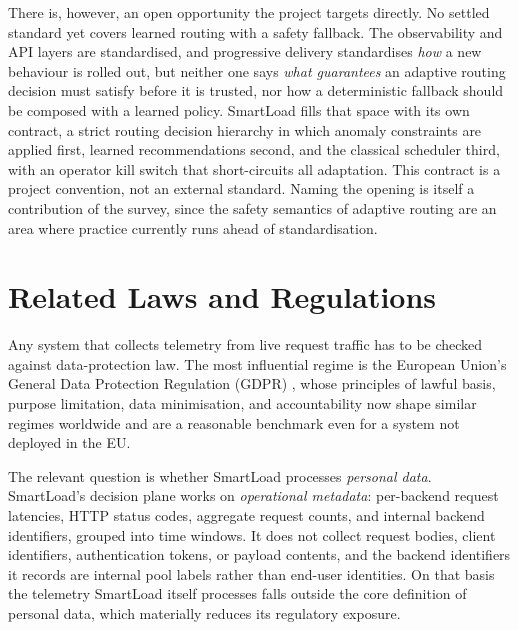 There is, however, an open opportunity the project targets directly. No settled
standard yet covers learned routing with a safety fallback. The observability
and API layers are standardised, and progressive delivery standardises
\emph{how} a new behaviour is rolled out, but neither one says \emph{what
guarantees} an adaptive routing decision must satisfy before it is trusted, nor
how a deterministic fallback should be composed with a learned policy. SmartLoad
fills that space with its own contract, a strict routing decision hierarchy in
which anomaly constraints are applied first, learned recommendations second, and
the classical scheduler third, with an operator kill switch that short-circuits
all adaptation. This contract is a project convention, not an external standard.
Naming the opening is itself a contribution of the survey, since the safety
semantics of adaptive routing are an area where practice currently runs ahead of
standardisation.

\section{Related Laws and Regulations}
\label{lit:sec:laws}

Any system that collects telemetry from live request traffic has to be checked
against data-protection law. The most influential regime is the European Union's
General Data Protection Regulation (GDPR) \cite{gdpr2016}, whose principles of
lawful basis, purpose limitation, data minimisation, and accountability now
shape similar regimes worldwide and are a reasonable benchmark even for a system
not deployed in the EU.

The relevant question is whether SmartLoad processes \emph{personal data}.
SmartLoad's decision plane works on \emph{operational metadata}: per-backend
request latencies, HTTP status codes, aggregate request counts, and internal
backend identifiers, grouped into time windows. It does not collect request
bodies, client identifiers, authentication tokens, or payload contents, and the
backend identifiers it records are internal pool labels rather than end-user
identities. On that basis the telemetry SmartLoad itself processes falls outside
the core definition of personal data, which materially reduces its regulatory
exposure.

